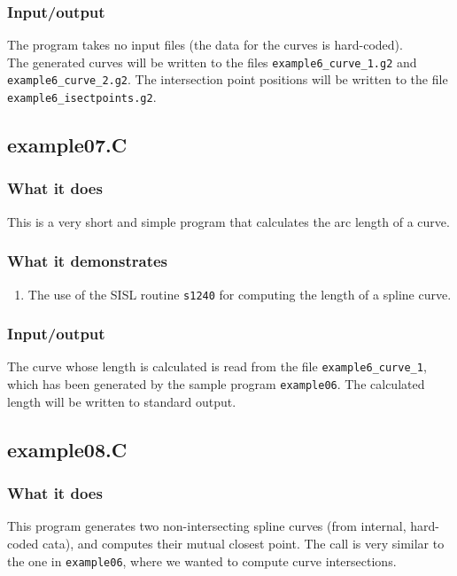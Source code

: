 \subsubsection{Input/output}
The program takes no input files (the data for the curves is hard-coded).  \\
The generated curves will be written to the files \verb/example6_curve_1.g2/ and \\
\verb/example6_curve_2.g2/.  The intersection point positions will be written to the file
\verb/example6_isectpoints.g2/.

\subsection{example07.C}

\subsubsection{What it does}
This is a very short and simple program that calculates the arc length of a curve.
\subsubsection{What it demonstrates}
\begin{enumerate}
\item The use of the SISL routine \verb/s1240/ for computing the length of a spline curve.
\end{enumerate}
\subsubsection{Input/output}
The curve whose length is calculated is read from the file \verb/example6_curve_1/, which
has been generated by the sample program \verb/example06/.  The calculated length will be
written to standard output.

\subsection{example08.C}

\subsubsection{What it does}
This program generates two non-intersecting spline curves (from internal, hard-coded cata), and
computes their mutual closest point.  The call is very similar to the one in \verb/example06/, 
where we wanted to compute curve intersections.
